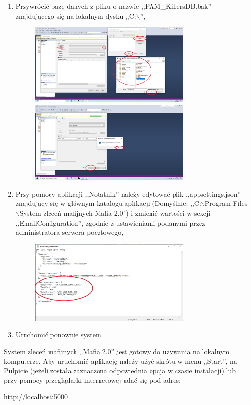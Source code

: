 \documentclass[12pt,a4paper]{article}
\begin{document}
\begin{enumerate}
				\item Przywrócić bazę danych z pliku o nazwie ,,PAM\_KillersDB.bak'' znajdującego się na lokalnym dysku ,,C:$\backslash$'',
					\begin{figure}[H]
						\centering
						\includegraphics[width=8cm]{img/Local_Install_11.eps}\\
						\includegraphics[width=8cm]{img/Local_Install_12.eps}
					\end{figure}
									
				\item Przy pomocy aplikacji ,,Notatnik'' należy edytować plik ,,appsettings.json'' znajdujący się w głównym katalogu aplikacji (Domyślnie:
					,,C:$\backslash$Program Files$\backslash$System zleceń mafijnych Mafia 2.0'') i zmienić wartości w sekcji ,,EmailConfiguration'', zgodnie z ustawieniami podanymi
					przez administratora serwera pocztowego,
					\begin{figure}[H]
						\centering
						\includegraphics[width=8cm]{img/Local_Install_13.eps}
					\end{figure}				
					
				\item Uruchomić ponownie system.
			\end{enumerate}
			System zleceń mafijnych ,,Mafia 2.0'' jest gotowy do używania na lokalnym komputerze. Aby uruchomić aplikację należy użyć skrótu w menu ,,Start'', na Pulpicie (jeżeli została
			zaznaczona odpowiednia opcja w czasie instalacji) lub przy pomocy przeglądarki internetowej udać się pod adres:
			\begin{tcolorbox}[minipage,colback=white,arc=0pt,outer arc=0pt, fontupper=\footnotesize]
				\url {http://localhost:5000}
			\end{tcolorbox}
			
\end{document}
